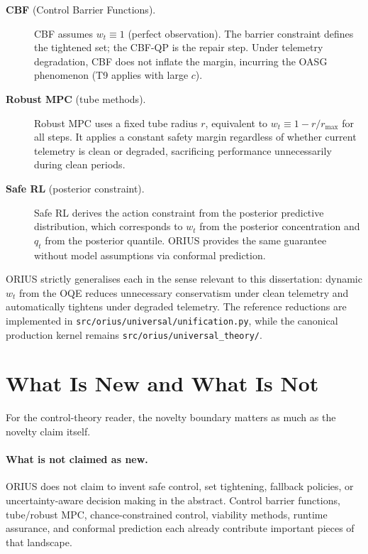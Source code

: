 \begin{description}
  \item[\textbf{CBF} (Control Barrier Functions).]
    CBF assumes $w_t \equiv 1$ (perfect observation).  The barrier constraint
    defines the tightened set; the CBF-QP is the repair step.  Under
    telemetry degradation, CBF does not inflate the margin, incurring the
    OASG phenomenon (T9 applies with large $c$).
  \item[\textbf{Robust MPC} (tube methods).]
    Robust MPC uses a fixed tube radius $r$, equivalent to $w_t \equiv
    1 - r/r_{\max}$ for all steps.  It applies a constant safety margin
    regardless of whether current telemetry is clean or degraded,
    sacrificing performance unnecessarily during clean periods.
  \item[\textbf{Safe RL} (posterior constraint).]
    Safe RL derives the action constraint from the posterior predictive
    distribution, which corresponds to $w_t$ from the posterior concentration
    and $q_t$ from the posterior quantile.  ORIUS provides the same guarantee
    without model assumptions via conformal prediction.
\end{description}

ORIUS strictly generalises each in the sense relevant to this dissertation:
dynamic $w_t$ from the OQE reduces unnecessary conservatism under clean
telemetry and automatically tightens under degraded telemetry.  The
reference reductions are implemented in \texttt{src/orius/universal/unification.py},
while the canonical production kernel remains
\texttt{src/orius/universal\_theory/}.

\section{What Is New and What Is Not}
\label{sec:what-is-new-and-not}

For the control-theory reader, the novelty boundary matters as much as the
novelty claim itself.

\paragraph{What is not claimed as new.}
ORIUS does not claim to invent safe control, set tightening, fallback
policies, or uncertainty-aware decision making in the abstract.  Control
barrier functions, tube/robust MPC, chance-constrained control, viability
methods, runtime assurance, and conformal prediction each already contribute
important pieces of that landscape.

